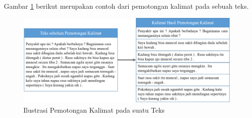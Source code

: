 Gambar \ref{fig:pemotongan_kalimat} berikut merupakan contoh dari pemotongan kalimat pada sebuah teks.
\begin{figure}
	\centering
	\includegraphics[width=\linewidth]{images/pemotongankalimat}
	\caption{Ilustrasi Pemotongan Kalimat pada suatu Teks}
	\label{fig:pemotongan_kalimat}
\end{figure}


